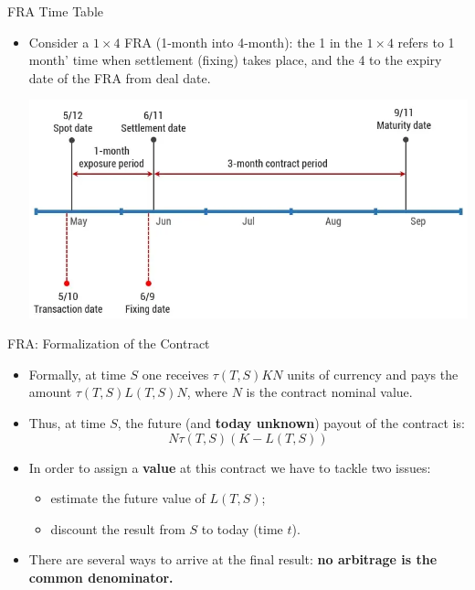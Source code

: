 \documentclass{beamer}
\begin{document}
\begin{frame}{FRA Time Table}
	\begin{itemize}
		\item Consider a $1\times 4$ FRA (1-month into 4-month): the 1 in the $1\times 4$ refers to 1 month' time when settlement (fixing) takes place, and the 4 to the expiry date of the FRA from deal date.
	\begin{center}
		\includegraphics[width=0.8\linewidth]{images/fra_timeline}
	\end{center}
\end{itemize}
\end{frame}

\begin{frame}{FRA: Formalization of the Contract}
	\begin{itemize}
		\item<1-> Formally, at time $S$ one receives $\tau(T, S)KN$ units of currency and pays the amount $\tau(T,S)L(T,S)N$, where $N$ is the contract nominal value.
		\item<2-> Thus, at time $S$, the future (and \textbf{today unknown}) payout of the contract is: 
		\begin{equation}
			N\tau(T,S)(K-L(T,S))
			\label{eq:fra_payoff}
		\end{equation}
		\item<3-> In order to assign a \textbf{value} at this contract we have to tackle two issues:
		\begin{itemize}
			\item<3-> estimate the future value of $L(T, S)$;
			\item<3-> discount the result from $S$ to today (time $t$).
		\end{itemize}
		\item<4-> There are several ways to arrive at the final result: \textbf{no arbitrage is the common denominator.}
	\end{itemize}
\end{frame}
\end{document}
